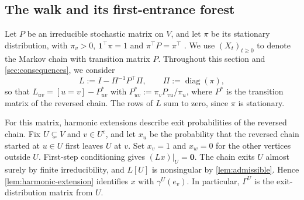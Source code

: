 \documentclass[onefignum,onetabnum,nohypdvips]{siamart250211}
\numberwithin{theorem}{section}
\numberwithin{equation}{section}
\newcommand{\one}{\mathbf{1}}
\newcommand{\zero}{\mathbf{0}}
\DeclareMathOperator{\diag}{diag}
\begin{document}
\subsection{The walk and its first-entrance forest}\label{sec:walkdef}

Let $P$ be an irreducible stochastic matrix on $V$, and let $\pi$ be
its stationary distribution, with $\pi_v>0$, $\one^{\top}\pi=1$ and
$\pi^{\top}P=\pi^{\top}$ \cite[Ch.~1]{LevinPeres2017}. We use
$(X_t)_{t\ge0}$ to denote the Markov chain with transition matrix $P$.
Throughout this section and \cref{sec:consequences}, we consider
\begin{equation}\label{eq:Ldef}
L:=I-\Pi^{-1}P^{\top}\Pi,\qquad \Pi:=\diag(\pi),
\end{equation}
so that $L_{uv}=[u=v]-P^{*}_{uv}$ with $P^{*}_{uv}:=\pi_vP_{vu}/\pi_u$,
where $P^{*}$ is the transition matrix of the reversed chain. The rows
of $L$ sum to zero, since $\pi$ is stationary.

For this matrix, harmonic extensions describe exit probabilities of
the reversed chain. Fix $U\subsetneq V$ and $v\in U^c$, and let $x_u$
be the probability that the reversed chain started at $u\in U$ first
leaves $U$ at $v$. Set $x_v=1$ and $x_w=0$ for the other vertices
outside $U$. First-step conditioning gives $(Lx)|_U=\zero$.
The chain exits $U$ almost surely by finite irreducibility, and
$L[U]$ is nonsingular by \cref{lem:admissible}. Hence
\cref{lem:harmonic-extension} identifies $x$ with $\gamma^U(e_v)$.
In particular, $\Gamma^U$ is the exit-distribution matrix from $U$.
\end{document}
